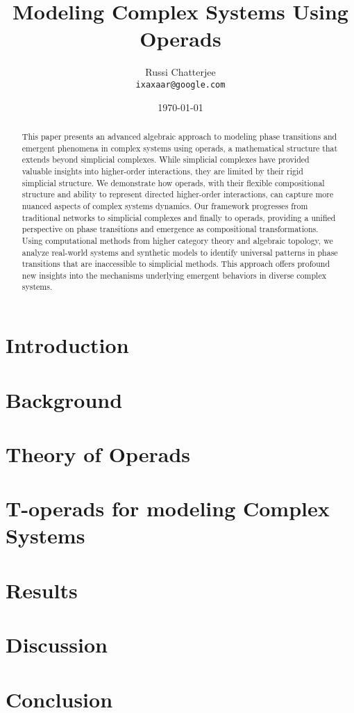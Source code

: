 \documentclass[12pt,a4paper]{article}
\title{Modeling Complex Systems Using Operads}
\author{Russi Chatterjee \\ \texttt{ixaxaar@google.com}}
\date{\today}
\begin{document}
\maketitle

\thispagestyle{empty}

\begin{abstract}
\noindent
This paper presents an advanced algebraic approach to modeling phase transitions and emergent phenomena in complex systems using operads, a mathematical structure that extends beyond simplicial complexes. While simplicial complexes have provided valuable insights into higher-order interactions, they are limited by their rigid simplicial structure. We demonstrate how operads, with their flexible compositional structure and ability to represent directed higher-order interactions, can capture more nuanced aspects of complex systems dynamics. Our framework progresses from traditional networks to simplicial complexes and finally to operads, providing a unified perspective on phase transitions and emergence as compositional transformations. Using computational methods from higher category theory and algebraic topology, we analyze real-world systems and synthetic models to identify universal patterns in phase transitions that are inaccessible to simplicial methods. This approach offers profound new insights into the mechanisms underlying emergent behaviors in diverse complex systems.
\end{abstract}

\vspace{1cm}
\section{Introduction}


\section{Background}


\section{Theory of Operads}


\section{T-operads for modeling Complex Systems}


\section{Results}


\section{Discussion}


\section{Conclusion}




\end{document}
